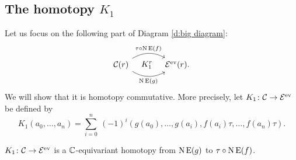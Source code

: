 \subsection{The homotopy $K_1$}\label{ss:K1}

Let us focus on the following part of Diagram \eqref{d:big diagram}:
\[
\begin{tikzcd}[column sep=large]
	\cC(r)
	\arrow[r,bend left,"\tau \comp \chains\EE(f)"]
	\arrow[r,bend right,"\chains\EE(g)"']
	\arrow[r,phantom,"K_1^r"]
	& \BE^\ev(r).
\end{tikzcd}
\]
We will show that it is homotopy commutative.
More precisely, let $K_1 \colon \mathcal{C} \to \mathcal{E}^{\mathrm{ev}}$ be defined by
\[
K_1(a_0,\dots,a_n) =
\sum_{i=0}^n \ (-1)^i (g(a_0), \dots, g(a_i), f(a_i) \tau, \dots, f(a_n) \tau).
\]

\begin{lemma}\label{l:K1}
	$K_1 \colon \mathcal{C} \to \mathcal{E}^{\mathrm{ev}}$ is a $\mathbb{C}$-equivariant homotopy from $\operatorname{N}\operatorname{E}(g)$ to $\tau \mathbin{\circ} \operatorname{N}\operatorname{E}(f)$.
\end{lemma}

